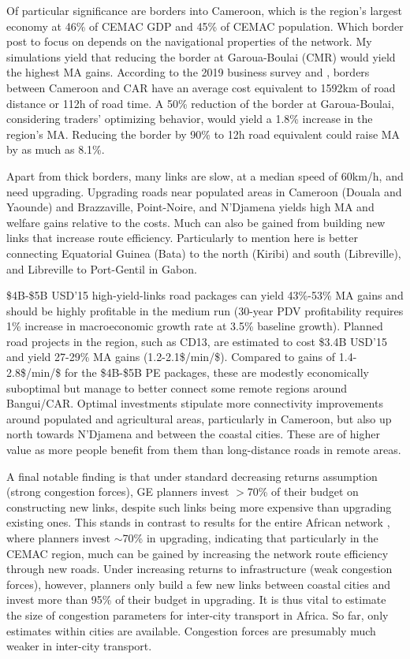 \documentclass[a4paper]{article}
\begin{document}
Of particular significance are borders into Cameroon, which is the region's largest economy at 46\% of CEMAC GDP and 45\% of CEMAC population. Which border post to focus on depends on the navigational properties of the network. My simulations yield that reducing the border at Garoua-Boulai (CMR) would yield the highest MA gains. According to the 2019 business survey and \citet{krantz2024optimal}, borders between Cameroon and CAR have an average cost equivalent to 1592km of road distance or 112h of road time. A 50\% reduction of the border at Garoua-Boulai, considering traders' optimizing behavior, would yield a 1.8\% increase in the region's MA. Reducing the border by 90\% to 12h road equivalent could raise MA by as much as 8.1\%. \newline  

Apart from thick borders, many links are slow, at a median speed of 60km/h, and need upgrading. Upgrading roads near populated areas in Cameroon (Douala and Yaounde) and Brazzaville, Point-Noire, and N'Djamena yields high MA and welfare gains relative to the costs. Much can also be gained from building new links that increase route efficiency. Particularly to mention here is better connecting Equatorial Guinea (Bata) to the north (Kiribi) and south (Libreville), and Libreville to Port-Gentil in Gabon. \newline 

\$4B-\$5B USD'15 high-yield-links road packages can yield 43\%-53\% MA gains and should be highly profitable in the medium run (30-year PDV profitability requires 1\% increase in macroeconomic growth rate at 3.5\% baseline growth). Planned road projects in the region, such as CD13, are estimated to cost \$3.4B USD'15 and yield 27-29\% MA gains (1.2-2.1\$/min/\$). Compared to gains of 1.4-2.8\$/min/\$ for the \$4B-\$5B PE packages, these are modestly economically suboptimal but manage to better connect some remote regions around Bangui/CAR. Optimal investments stipulate more connectivity improvements around populated and agricultural areas, particularly in Cameroon, but also up north towards N'Djamena and between the coastal cities. These are of higher value as more people benefit from them than long-distance roads in remote areas. \newline 

A final notable finding is that under standard decreasing returns assumption (strong congestion forces), GE planners invest $>$70\% of their budget on constructing new links, despite such links being more expensive than upgrading existing ones. This stands in contrast to results for the entire African network \citep{krantz2024optimal}, where planners invest $\sim$70\% in upgrading, indicating that particularly in the CEMAC region, much can be gained by increasing the network route efficiency through new roads. Under increasing returns to infrastructure (weak congestion forces), however, planners only build a few new links between coastal cities and invest more than 95\% of their budget in upgrading. It is thus vital to estimate the size of congestion parameters for inter-city transport in Africa. So far, only estimates within cities are available. Congestion forces are presumably much weaker in inter-city transport. 
 
\end{document}
